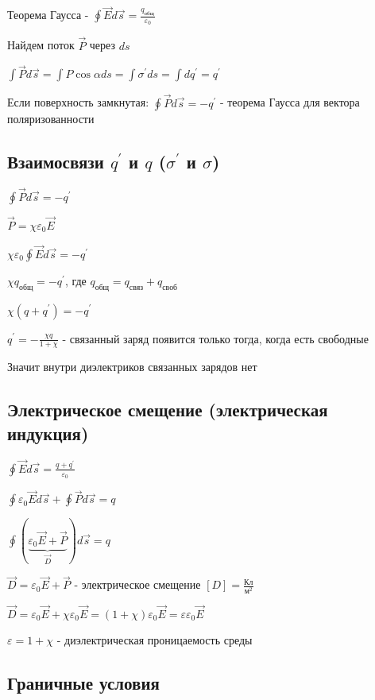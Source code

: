 \documentclass[12pt]{article}
\begin{document}
\Mems Теорема Гаусса - $\oint \vec{E} d\vec{s} = \frac{q_\text{общ}}{\varepsilon_0}$

Найдем поток $\vec{P}$ через $ds$

$\int \vec{P} d\vec{s} = \int P\cos\alpha ds = \int \sigma^\prime ds = \int dq^\prime = q^\prime$

Если поверхность замкнутая: $\oint \vec{P} d\vec{s} = -q^\prime$ - теорема Гаусса для вектора поляризованности

\subsection{Взаимосвязи $q^\prime$ и $q$ ($\sigma^\prime$ и $\sigma$)}

$\oint \vec{P} d\vec{s} = -q^\prime$

$\vec{P} = \chi \varepsilon_0 \vec{E}$

$\chi \varepsilon_0 \oint \vec{E} d\vec{s} = -q^\prime$

$\chi q_{\text{общ}} = -q^\prime$, где $q_\text{общ} = q_{\text{связ}} + q_\text{своб}$

$\chi (q + q^\prime) = -q^\prime$

$q^\prime = -\frac{\chi q}{1 + \chi}$ - связанный заряд появится только тогда, когда есть свободные

Значит внутри диэлектриков связанных зарядов нет

\subsection{Электрическое смещение (электрическая индукция)}

\Mem $\oint \vec{E} d\vec{s} = \frac{q + q^\prime}{\varepsilon_0}$

$\oint \varepsilon_0 \vec{E} d\vec{s} + \oint \vec{P}d\vec{s} = q$

$\oint (\underset{\vec{D}}{\underbrace{\varepsilon_0 \vec{E} + \vec{P}}}) d\vec{s} = q$

$\vec{D} = \varepsilon_0 \vec{E} + \vec{P}$ - электрическое смещение \hfill $[D] = \frac{\text{Кл}}{\text{м}^2}$

$\vec{D} = \varepsilon_0 \vec{E} + \chi \varepsilon_0 \vec{E} = (1 + \chi) \varepsilon_0 \vec{E} = \varepsilon \varepsilon_0 \vec{E}$

$\varepsilon = 1 + \chi$ - диэлектрическая проницаемость среды

\subsection{Граничные условия}
\end{document}
